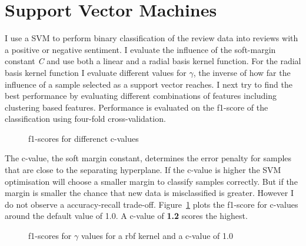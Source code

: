 \documentclass[11pt]{article}
\begin{document}
\section{Support Vector Machines}

I use a SVM to perform binary classification of the review data into reviews with a positive or negative sentiment. I evaluate the influence of the soft-margin constant \emph{C} and use both a linear and a radial basis kernel function. For the radial basis kernel function I evaluate different values for \emph{$\gamma$}, the inverse of how far the influence of a sample selected as a support vector reaches. I next try to find the best performance by evaluating different combinations of features including clustering based features. Performance is evaluated on the f1-score of the classification using four-fold cross-validation.

\begin{figure}
  \caption{f1-scores for differenct c-values}
  \label{fig:c-val}
\end{figure}

The c-value, the soft margin constant, determines the error penalty for samples that are close to the separating hyperplane. If the c-value is higher the SVM optimisation will choose a smaller margin to classify samples correctly. But if the margin is smaller the chance that new data is misclassified is greater. However I do not observe a accuracy-recall trade-off. Figure~\ref{fig:c-val} plots the f1-score for c-values around the default value of 1.0. A c-value of \textbf{1.2} scores the highest.

\begin{figure}
  \caption{f1-scores for $\gamma$ values for a rbf kernel and a c-value of 1.0}
  \label{fig:gamma}
\end{figure}
\end{document}
